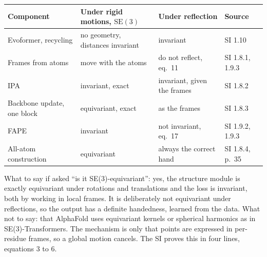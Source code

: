 \documentclass[10pt,a4paper]{article}
\newcommand{\sect}[2]{\vspace{5pt}{\large\bfseries\color{#1}#2}\par\vspace{1pt}}
\newcommand{\SE}{\mathrm{SE}(3)}
\begin{document}
\sect{black}{6. Summary}
\smallskip
{\centering
\begin{tabular}{@{}llll@{}}
\toprule
Component & Under rigid motions, $\SE$ & Under reflection & Source \\
\midrule
Evoformer, recycling & no geometry, distances invariant & invariant & SI 1.10 \\
Frames from atoms & move with the atoms & do not reflect, eq.\ 11 & SI 1.8.1, 1.9.3 \\
IPA & invariant, exact & invariant, given the frames & SI 1.8.2 \\
Backbone update, one block & equivariant, exact & as the frames & SI 1.8.3 \\
FAPE & invariant & not invariant, eq.\ 17 & SI 1.9.2, 1.9.3 \\
All-atom construction & equivariant & always the correct hand & SI 1.8.4, p.~35 \\
\bottomrule
\end{tabular}\par}
\smallskip

What to say if asked ``is it SE(3)-equivariant'': yes, the structure module is exactly equivariant under rotations and translations and the loss is invariant, both by working in local frames. It is deliberately not equivariant under reflections, so the output has a definite handedness, learned from the data. What not to say: that AlphaFold uses equivariant kernels or spherical harmonics as in SE(3)-Transformers. The mechanism is only that points are expressed in per-residue frames, so a global motion cancels. The SI proves this in four lines, equations 3 to 6.
\end{document}
